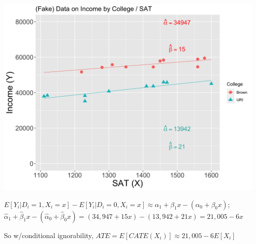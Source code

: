 \documentclass[11pt,english,handout]{beamer}
\newenvironment{wideitemize}{\itemize\addtolength{\itemsep}{10pt}}{\enditemize}
\begin{document}
\begin{frame}
	\centering
	\includegraphics[width =.8\linewidth]{fake-sat-with-trend-both-betas.png}
	
	\begin{wideitemize}
		\item
		 $E[Y_i | D_i = 1, X_i = x]-E[Y_i | D_i = 0, X_i = x]\approx \alpha_1+\beta_1 x - (\alpha_0 +\beta_0x)$; \pause{} $\hat\alpha_1+\hat\beta_1 x - (\hat\alpha_0 +\hat\beta_0x) = (34,947+15 x)-(13,942+21 x)= 21,005-6x$\pause{}
		\item So w/conditional ignorability, $ATE= E[CATE(X_i)]\approx 21,005-6E[X_i]$
	\end{wideitemize}
\end{frame}


		
\end{document}
